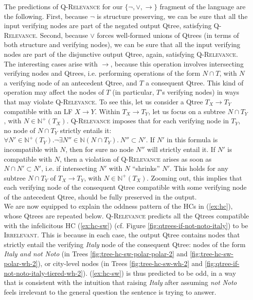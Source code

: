 The predictions of \textsc{Q-Relevance} for our $\lbrace \neg, \vee, \rightarrow\rbrace$ fragment of the language are the following. First, because $\neg$ is structure preserving, we can be sure that all the input verifying nodes are part of the negated output Qtree, satisfying \textsc{Q-Relevance}. Second, because $\vee$ forces well-formed unions of Qtrees (in terms of both structure and verifying nodes), we can be sure that all the input verifying nodes are part of the disjunctive output Qtree, again, satisfying \textsc{Q-Relevance}. The interesting cases arise with $\rightarrow$, because this operation involves intersecting verifying nodes and Qtrees, i.e. performing operations of the form $N \cap T$, with $N$ a verifying node of an antecedent Qtree, and $T$ a consequent Qtree. This kind of operation may affect the nodes of $T$ (in particular, $T$'s verifying nodes) in ways that may violate \textsc{Q-Relevance}. To see this, let us consider a Qtree $T_X\rightarrow T_Y$ compatible with an LF $X \rightarrow Y$. Within $T_X\rightarrow T_Y$, let us focus on a subtree $N\cap T_Y$, with $N \in \mathbb{N}^+(T_X)$. \textsc{Q-Relevance} imposes that for each verifying node in $T_Y$, no node of $N\cap T_Y$ strictly entails it: $\forall N' \in \mathbb{N}^+(T_Y). \neg \exists N'' \in \mathbb{N}(N\cap T_Y). \ N'' \subset N'$. If $N'$ in this formula is incompatible with $N$, then for sure no node $N''$ will strictly entail it. If $N'$ is compatible with $N$, then a violation of \textsc{Q-Relevance} arises as soon as $N \cap N' \subset N'$, i.e. if intersecting $N'$ with $N$ ``shrinks'' $N'$. This holds for any subtree $N\cap T_Y$ of $T_X\rightarrow T_Y$, with $N \in \mathbb{N}^+(T_X)$. Zooming out, this implies that each verifying node of the consequent Qtree compatible with some verifying node of the antecedent Qtree, should be fully preserved in the output.\\

We are now equipped to explain the oddness pattern of the HCs in (\ref{ex:hc}), whose Qtrees are repeated below. \textsc{Q-Relevance} predicts all the Qtrees compatible with the infelicitous HC (\ref{ex:hc-sw}) (cf. Figure \ref{fig:qtrees-if-not-noto-italy}) to be \textsc{Irrelevant}. This is because in each case, the output Qtree contains nodes that strictly entail the verifying \textit{Italy} node of the consequent Qtree: nodes of the form \textit{Italy and not Noto} (in Trees \ref{fig:tree-hc-sw-polar-polar-2} and \ref{fig:tree-hc-sw-polar-wh-2}), or city-level nodes (in Trees \ref{fig:tree-hc-sw-wh-2} and \ref{fig:qtree-if-not-noto-italy-tiered-wh-2}). (\ref{ex:hc-sw}) is thus predicted to be odd, in a way that is consistent with the intuition that raising \textit{Italy} after assuming \textit{not Noto} feels irrelevant to the general question the sentence is trying to answer.

